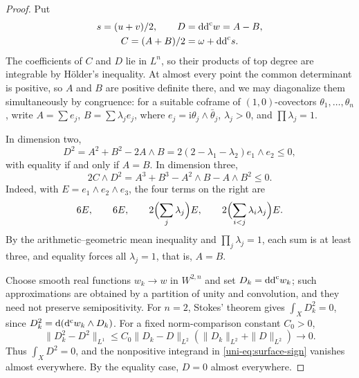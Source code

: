 \begin{proof}
Put
\[
 \begin{gathered}
 s=(u+v)/2,\qquad D=\mathrm{dd}^{\mathrm{c}} w=A-B,\\
 C=(A+B)/2=\omega+\mathrm{dd}^{\mathrm{c}} s.
 \end{gathered}
\]
The coefficients of $C$ and $D$ lie in $L^n$, so their products of top degree are
integrable by H\"older's inequality.  At almost every point the common
determinant is positive, so $A$ and $B$ are positive definite there, and we may diagonalize
them simultaneously by congruence: for a suitable coframe of $(1,0)$-covectors $\theta_1,\ldots,\theta_n$, write
$A=\sum e_j$, $B=\sum\lambda_j e_j$, where
$e_j=\mathrm{i}\theta_j\wedge\bar\theta_j$, $\lambda_j>0$, and
$\prod\lambda_j=1$.

In dimension two,
\begin{equation}\label{uni-eq:surface-sign}
 D^2=A^2+B^2-2A\wedge B
    =2(2-\lambda_1-\lambda_2)e_1\wedge e_2\leq0,
\end{equation}
with equality if and only if $A=B$.  In dimension three,
\begin{equation}\label{uni-eq:threefold-algebra}
 2C\wedge D^2=A^3+B^3-A^2\wedge B-A\wedge B^2\leq0.
\end{equation}
Indeed, with $E=e_1\wedge e_2\wedge e_3$, the four terms on the right
are
\[
 6E,\qquad 6E,\qquad 2\Bigl(\sum_j\lambda_j\Bigr)E,
 \qquad 2\Bigl(\sum_{i<j}\lambda_i\lambda_j\Bigr)E.
\]
By the arithmetic--geometric mean inequality and $\prod_j\lambda_j=1$, each sum is at least three, and equality forces all
$\lambda_j=1$, that is, $A=B$.

Choose smooth real functions $w_k\to w$ in $W^{2,n}$ and set
$D_k=\mathrm{dd}^{\mathrm{c}} w_k$; such approximations are obtained by a partition of unity and convolution, and they
need not preserve semipositivity.  For $n=2$, Stokes' theorem gives
$\int_XD_k^2=0$, since
$D_k^2=\mathrm{d}(\mathrm d^{\mathrm c} w_k\wedge D_k)$.  For a fixed norm-comparison constant $C_0>0$,
\[
 \|D_k^2-D^2\|_{L^1}
 \leq C_0\|D_k-D\|_{L^2}(\|D_k\|_{L^2}+\|D\|_{L^2})\longrightarrow0.
\]
Thus $\int_XD^2=0$, and the nonpositive integrand in
\eqref{uni-eq:surface-sign} vanishes almost everywhere.  By the equality
case, $D=0$ almost everywhere.


\end{proof}
